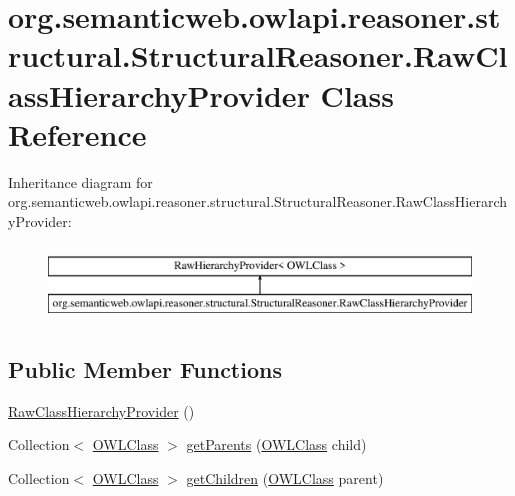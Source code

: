 \hypertarget{classorg_1_1semanticweb_1_1owlapi_1_1reasoner_1_1structural_1_1_structural_reasoner_1_1_raw_class_hierarchy_provider}{\section{org.\-semanticweb.\-owlapi.\-reasoner.\-structural.\-Structural\-Reasoner.\-Raw\-Class\-Hierarchy\-Provider Class Reference}
\label{classorg_1_1semanticweb_1_1owlapi_1_1reasoner_1_1structural_1_1_structural_reasoner_1_1_raw_class_hierarchy_provider}
}
Inheritance diagram for org.\-semanticweb.\-owlapi.\-reasoner.\-structural.\-Structural\-Reasoner.\-Raw\-Class\-Hierarchy\-Provider\-:\begin{figure}[H]
\begin{center}
\leavevmode
\includegraphics[height=2.000000cm]{classorg_1_1semanticweb_1_1owlapi_1_1reasoner_1_1structural_1_1_structural_reasoner_1_1_raw_class_hierarchy_provider}
\end{center}
\end{figure}
\subsection*{Public Member Functions}
\begin{DoxyCompactItemize}
\item 
\hyperlink{classorg_1_1semanticweb_1_1owlapi_1_1reasoner_1_1structural_1_1_structural_reasoner_1_1_raw_class_hierarchy_provider_a1a4e57dcbfcc5f84c9d2ffa4e3cc3cc9}{Raw\-Class\-Hierarchy\-Provider} ()
\item 
Collection$<$ \hyperlink{interfaceorg_1_1semanticweb_1_1owlapi_1_1model_1_1_o_w_l_class}{O\-W\-L\-Class} $>$ \hyperlink{classorg_1_1semanticweb_1_1owlapi_1_1reasoner_1_1structural_1_1_structural_reasoner_1_1_raw_class_hierarchy_provider_a8078ae14676494d75331870c3231edad}{get\-Parents} (\hyperlink{interfaceorg_1_1semanticweb_1_1owlapi_1_1model_1_1_o_w_l_class}{O\-W\-L\-Class} child)
\item 
Collection$<$ \hyperlink{interfaceorg_1_1semanticweb_1_1owlapi_1_1model_1_1_o_w_l_class}{O\-W\-L\-Class} $>$ \hyperlink{classorg_1_1semanticweb_1_1owlapi_1_1reasoner_1_1structural_1_1_structural_reasoner_1_1_raw_class_hierarchy_provider_afd97de58d3551c4b90024aa9cfdf881a}{get\-Children} (\hyperlink{interfaceorg_1_1semanticweb_1_1owlapi_1_1model_1_1_o_w_l_class}{O\-W\-L\-Class} parent)
\end{DoxyCompactItemize}


